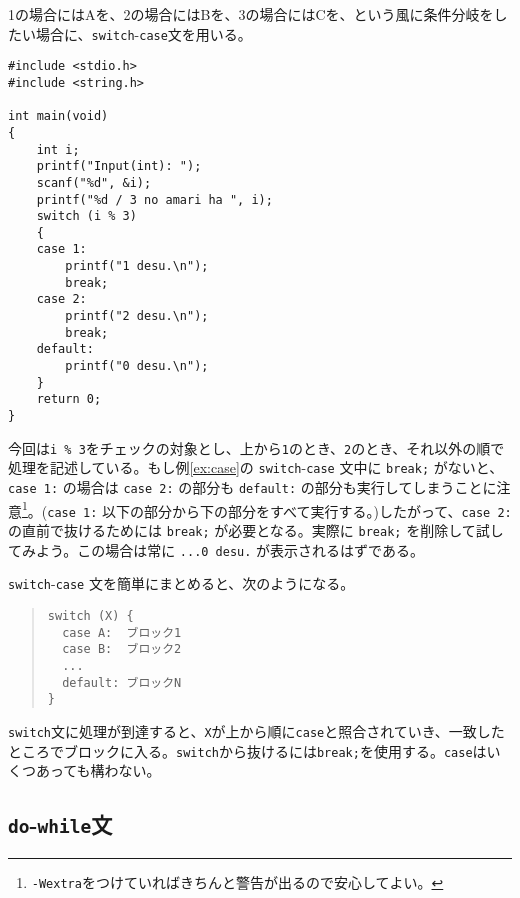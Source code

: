 1の場合にはAを、2の場合にはBを、3の場合にはCを、という風に条件分岐をしたい場合に、\texttt{switch}-\texttt{case}文を用いる。
\begin{reidai}\label{ex:case}
    \begin{verbatim}
#include <stdio.h>
#include <string.h>

int main(void)
{
    int i;
    printf("Input(int): ");
    scanf("%d", &i);
    printf("%d / 3 no amari ha ", i);
    switch (i % 3)
    {
    case 1:
        printf("1 desu.\n");
        break;
    case 2:
        printf("2 desu.\n");
        break;
    default:
        printf("0 desu.\n");
    }
    return 0;
}
\end{verbatim}
\end{reidai} \noindent
今回は\texttt{i \% 3}をチェックの対象とし、上から\texttt{1}のとき、\texttt{2}のとき、それ以外の順で処理を記述している。もし例\ref{ex:case}の \texttt{switch}-\texttt{case} 文中に \texttt{break;} がないと、\texttt{case 1:} の場合は \texttt{case 2:} の部分も \texttt{default:} の部分も実行してしまうことに注意\footnote{\texttt{-Wextra}をつけていればきちんと警告が出るので安心してよい。}。(\texttt{case 1:} 以下の部分から下の部分をすべて実行する。)したがって、\texttt{case 2:} の直前で抜けるためには \texttt{break;} が必要となる。実際に \texttt{break;} を削除して試してみよう。この場合は常に \texttt{...0 desu.} が表示されるはずである。

\texttt{switch}-\texttt{case} 文を簡単にまとめると、次のようになる。
\begin{quote}
    \begin{verbatim}
switch (X) {
  case A:  ブロック1
  case B:  ブロック2
  ...
  default: ブロックN
}
\end{verbatim}
\end{quote}
\texttt{switch}文に処理が到達すると、\texttt{X}が上から順に\texttt{case}と照合されていき、一致したところでブロックに入る。\texttt{switch}から抜けるには\texttt{break;}を使用する。\texttt{case}はいくつあっても構わない。

\subsection{\texttt{do}-\texttt{while}文}

